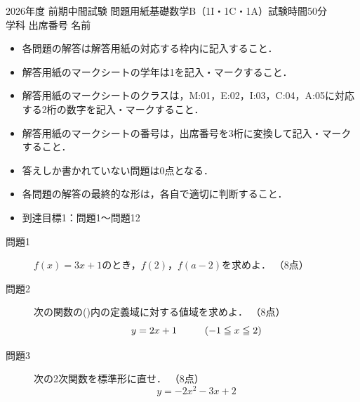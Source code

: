 \documentclass[twocolumn,a4paper,10pt]{ltjsarticle}
\newcommand{\ExamTitle}{基礎数学B}
\newcommand{\ExamTerm}{2026年度 前期中間試験 問題用紙}
\newcommand{\ExamClass}{（1I・1C・1A）}
\newcommand{\ExamTime}{50分}
\newcommand{\ExamTarget}{到達目標1：問題1～問題12}
\begin{document}
\small
%
\begin{flushleft}
\ExamTerm \quad \ExamTitle \ExamClass 試験時間\ExamTime\\
\vspace{2mm}
学科\hspace{15mm} 出席番号 \hspace{15mm} 名前\hspace{120mm}
%
\hspace{10mm}

\begin{itemize}
\itemsep=-0.4mm
\item 各問題の解答は解答用紙の対応する枠内に記入すること．
\item 解答用紙のマークシートの学年は1を記入・マークすること．
\item 解答用紙のマークシートのクラスは，M:01，E:02，I:03，C:04，A:05に対応する2桁の数字を記入・マークすること．
\item 解答用紙のマークシートの番号は，出席番号を3桁に変換して記入・マークすること．
\item 答えしか書かれていない問題は0点となる．
\item 各問題の解答の最終的な形は，各自で適切に判断すること．
\item \ExamTarget
\end{itemize}


%
\end{flushleft}


\begin{description}
  \item[問題1]
  $f(x)=3x+1$のとき，$f(2)$，$f(a-2)$を求めよ．
  \tiny{（8点）}
\end{description}
\vspace{20mm}

\begin{description}
  \item[問題2]
  次の関数の()内の定義域に対する値域を求めよ．
  \tiny{（8点）}
  \normalsize
  \begin{equation}
    y=2x+1 \hspace{10mm} (-1 \leqq x \leqq 2)  \nonumber
  \end{equation}
\end{description}
\vspace{30mm}

\begin{description}
  \item[問題3]
  次の2次関数を標準形に直せ．
  \tiny{（8点）}
    \normalsize
  \begin{equation}
    y=-2x^2-3x+2  \nonumber
  \end{equation}

\end{description}
\vspace{30mm}
\end{document}
